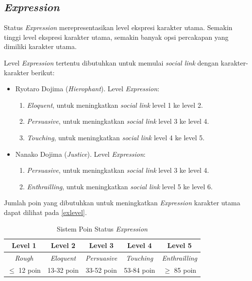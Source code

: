 \subsection{\textit{Expression}}
Status \textit{Expression} merepresentasikan level ekspresi karakter utama. Semakin tinggi level ekspresi karakter utama, semakin banyak opsi percakapan yang dimiliki karakter utama.

Level \textit{Expression} tertentu dibutuhkan untuk memulai \textit{social link} dengan karakter-karakter berikut:
\begin{itemize}
    \item{Ryotaro Dojima (\textit{Hierophant}). Level \textit{Expression}:
                \begin{enumerate}
                    \item \textit{Eloquent}, untuk meningkatkan \textit{social link} level 1 ke level 2.
                    \item \textit{Persuasive}, untuk meningkatkan \textit{social link} level 3 ke level 4.
                    \item \textit{Touching}, untuk meningkatkan \textit{social link} level 4 ke level 5.
                \end{enumerate}
          }
    \item{Nanako Dojima (\textit{Justice}).
                Level \textit{Expression}:
                \begin{enumerate}
                    \item \textit{Persuasive}, untuk meningkatkan \textit{social link} level 3 ke level 4.
                    \item \textit{Enthrailling}, untuk meningkatkan \textit{social link} level 5 ke level 6.
                \end{enumerate}
          }
\end{itemize}

Jumlah poin yang dibutuhkan untuk meningkatkan \textit{Expression} karakter utama dapat dilihat pada \autoref{exlevel}.
\begin{table}[H]
    \caption{\label{exlevel}Sistem Poin Status \textit{Expression}}
    \begin{center}
        \begin{tabular}{ | c | c | c | c | c | }
            \hline
            \textbf{Level 1} & \textbf{Level 2}  & \textbf{Level 3}    & \textbf{Level 4}  & \textbf{Level 5}      \\
            \hline
            \textit{Rough}   & \textit{Eloquent} & \textit{Persuasive} & \textit{Touching} & \textit{Enthrailling} \\
            \hline
            $\le$ 12 poin    & 13-32 poin        & 33-52 poin          & 53-84 poin        & $\ge$ 85 poin         \\
            \hline
        \end{tabular}
    \end{center}
\end{table}

